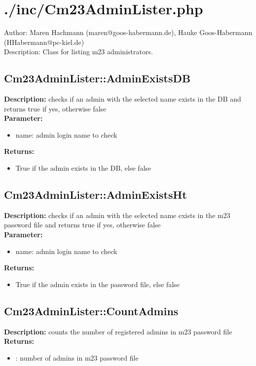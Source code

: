\newpage\section{./inc/Cm23AdminLister.php}
 Author: Maren Hachmann (maren@goos-habermann.de), Hauke Goos-Habermann (HHabermann@pc-kiel.de)\\
 Description: Class for listing m23 administrators.\\

\subsection{Cm23AdminLister::AdminExistsDB}
\textbf{Description:} checks if an admin with the selected name exists in the DB and returns true if yes, otherwise false\\
\textbf{Parameter:}
\begin{itemize}
\item name: admin login name to check
\end{itemize}
\textbf{Returns:}
\begin{itemize}
\item True if the admin exists in the DB, else false
\end{itemize}

\subsection{Cm23AdminLister::AdminExistsHt}
\textbf{Description:} checks if an admin with the selected name exists in the m23 password file and returns true if yes, otherwise false\\
\textbf{Parameter:}
\begin{itemize}
\item name: admin login name to check
\end{itemize}
\textbf{Returns:}
\begin{itemize}
\item True if the admin exists in the password file, else false
\end{itemize}

\subsection{Cm23AdminLister::CountAdmins}
\textbf{Description:} counts the number of registered admins in m23 password file\\
\textbf{Returns:}
\begin{itemize}
\item : number of admins in m23 password file
\end{itemize}

